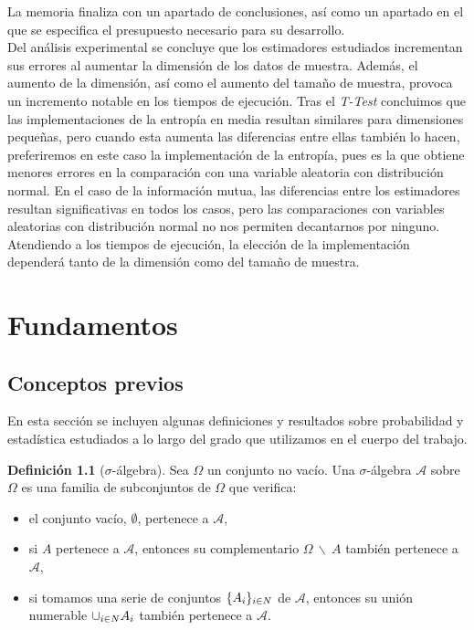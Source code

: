 \documentclass[12pt,a4paper]{report} %
\let\mathbb\relax
\theoremstyle{definition}
\newtheorem{definition}{Definición}[section]
\begin{document}
La memoria finaliza con un apartado de conclusiones, así como un apartado en el que se especifica el presupuesto necesario para su desarrollo.\\

Del análisis experimental se concluye que los estimadores estudiados incrementan sus errores al aumentar la dimensión de los datos de muestra. Además, el aumento de la dimensión, así como el aumento del tamaño de muestra, provoca un incremento notable en los tiempos de ejecución. Tras el \textit{T-Test} concluimos que las implementaciones de la entropía en media resultan similares para dimensiones pequeñas, pero cuando esta aumenta las diferencias entre ellas también lo hacen, preferiremos en este caso la implementación \cite{estimating} de la entropía, pues es la que obtiene menores errores en la comparación con una variable aleatoria con distribución normal. En el caso de la información mutua, las diferencias entre los estimadores resultan significativas en todos los casos, pero las comparaciones con variables aleatorias con distribución normal no nos permiten decantarnos por ninguno. Atendiendo a los tiempos de ejecución, la elección de la implementación dependerá tanto de la dimensión como del tamaño de muestra.\\


\chapter{Fundamentos}

\section{Conceptos previos}

En esta sección se incluyen algunas definiciones y resultados sobre probabilidad y estadística estudiados a lo largo del grado que utilizamos en el cuerpo del trabajo.\\

\begin{definition}[$\sigma$-álgebra]
  Sea $\Omega$ un conjunto no vacío. Una $\sigma$-álgebra $\mathcal{A}$ sobre $\Omega$ es una familia de subconjuntos de $\Omega$ que verifica:
  \begin{itemize}
  \item  el conjunto vacío, $\emptyset$, pertenece a $\mathcal{A}$,
  \item  si $A$ pertenece a $\mathcal{A}$, entonces su complementario $\Omega\ \backslash\ A$ también pertenece a $\mathcal{A}$,
 \item si tomamos una serie de conjuntos $\{A_i\}_{i\in \mathbb{N}}$ de $\mathcal{A}$, entonces su unión numerable $\cup_{i\in \mathbb{N}}A_i$ también pertenece a $\mathcal{A}$.\\
  \end{itemize}
  
\end{definition}
\end{document}
